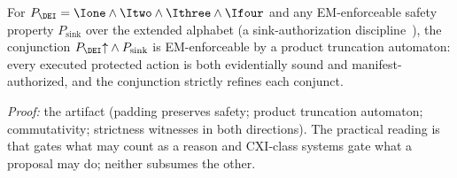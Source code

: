 \begin{proposition}
\label{prop:compose}
For $P_{\DEI}=\Ione\wedge\Itwo\wedge\Ithree\wedge\Ifour$ and any
EM-enforceable safety property $P_{\mathrm{sink}}$ over the extended
alphabet (a sink-authorization discipline~\cite{cxi}), the conjunction
$P_{\DEI}{\uparrow}\wedge P_{\mathrm{sink}}$ is EM-enforceable by a
product truncation automaton: every executed protected action is both
evidentially sound and manifest-authorized, and the conjunction
strictly refines each conjunct.
\end{proposition}
\noindent\emph{Proof:} the artifact (padding preserves safety; product
truncation automaton; commutativity; strictness witnesses in both
directions). The practical reading is that \DEI{} gates what may count
as a reason and CXI-class systems gate what a proposal may do; neither
subsumes the other.
